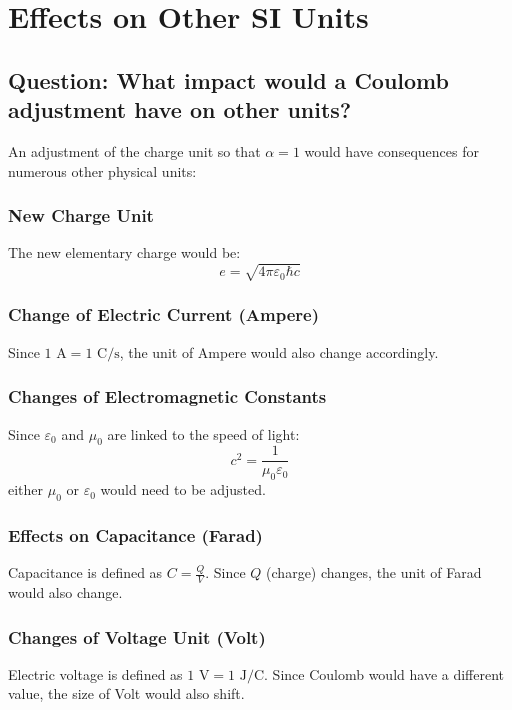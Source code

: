 \documentclass{article}
\begin{document}
\section{Effects on Other SI Units}

\subsection{Question: What impact would a Coulomb adjustment have on other units?}

An adjustment of the charge unit so that $\alpha = 1$ would have consequences for numerous other physical units:

\subsubsection{New Charge Unit}
The new elementary charge would be:
\begin{equation}
	e = \sqrt{4\pi\varepsilon_0\hbar c}
\end{equation}

\subsubsection{Change of Electric Current (Ampere)}
Since $1 \text{ A} = 1 \text{ C}/\text{s}$, the unit of Ampere would also change accordingly.

\subsubsection{Changes of Electromagnetic Constants}
Since $\varepsilon_0$ and $\mu_0$ are linked to the speed of light:
\begin{equation}
	c^2 = \frac{1}{\mu_0\varepsilon_0}
\end{equation}
either $\mu_0$ or $\varepsilon_0$ would need to be adjusted.

\subsubsection{Effects on Capacitance (Farad)}
Capacitance is defined as $C = \frac{Q}{V}$. Since $Q$ (charge) changes, the unit of Farad would also change.

\subsubsection{Changes of Voltage Unit (Volt)}
Electric voltage is defined as $1 \text{ V} = 1 \text{ J}/\text{C}$. Since Coulomb would have a different value, the size of Volt would also shift.
\end{document}
